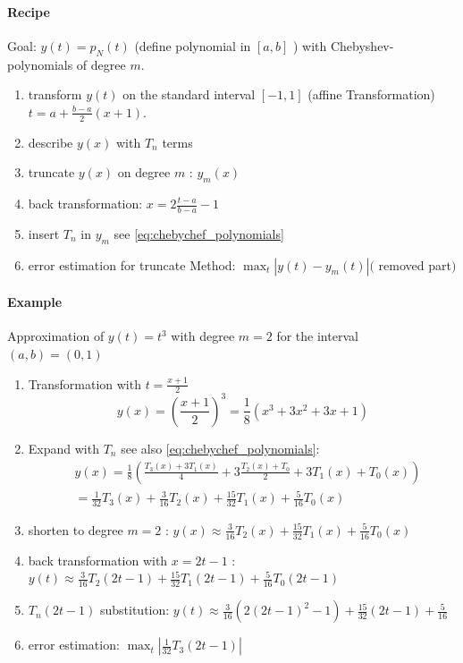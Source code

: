 \begin{multicols}{2}
[]
\paragraph{Recipe}
Goal: $y(t)=p_{N}(t)$ (define polynomial in $[a, b]$ ) with  Chebyshev-polynomials of degree $m$.
 \begin{enumerate}
    \item transform $y(t)$ on the standard interval $[-1,1]$ (affine Transformation) $t=a+\frac{b-a}{2}(x+1)$.
    \item describe $y(x)$ with $T_{n}$ terms
    \item truncate $y(x)$ on degree $m$ : $y_{m}(x)$
    \item back transformation: $x=2 \frac{t-a}{b-a}-1$
    \item insert $T_{n}$ in $y_{m}$ see \autoref{eq:chebychef_polynomials}
    \item error estimation for truncate Method:  \newline $\max _{t}\left|y(t)-y_{m}(t)\right|($ removed part$)$
 \end{enumerate}\mbox{}\newline{}\newline
 \paragraph{Example}
 Approximation of $y(t)=t^{3}$ with degree $m=2$ for the interval $(a, b)=(0,1)$
 \begin{enumerate}
    \item Transformation with $t=\frac{x+1}{2}$ 
    $$
    y(x)=\left(\frac{x+1}{2}\right)^{3}=\frac{1}{8}\left(x^{3}+3 x^{2}+3 x+1\right)
    $$
    \item Expand with $T_{n}$ see also \autoref{eq:chebychef_polynomials}:
    $$
    \begin{aligned}
    & y(x)=\frac{1}{8}\left(\frac{T_{3}(x)+3 T_{1}(x)}{4}+3 \frac{T_{2}(x)+T_{0}}{2}+3 T_{1}(x)+T_{0}(x)\right) \\
    & =\frac{1}{32} T_{3}(x)+\frac{3}{16} T_{2}(x)+\frac{15}{32} T_{1}(x)+\frac{5}{16} T_{0}(x)
    \end{aligned}
    $$
    \item shorten to degree $m=2$ :
     $y(x) \approx \frac{3}{16} T_{2}(x)+\frac{15}{32} T_{1}(x)+\frac{5}{16} T_{0}(x)$
    \item back transformation with $x=2 t-1$ :
     $y(t) \approx \frac{3}{16} T_{2}(2 t-1)+\frac{15}{32} T_{1}(2 t-1)+\frac{5}{16} T_{0}(2 t-1)$
    \item $T_{n}(2 t-1)$ substitution:
     $y(t) \approx \frac{3}{16}\left(2(2 t-1)^{2}-1\right)+\frac{15}{32}(2 t-1)+\frac{5}{16}$
    \item error estimation:
     $\max _{t}\left|\frac{1}{32} T_{3}(2 t-1)\right|$ 
 \end{enumerate}
\end{multicols}





